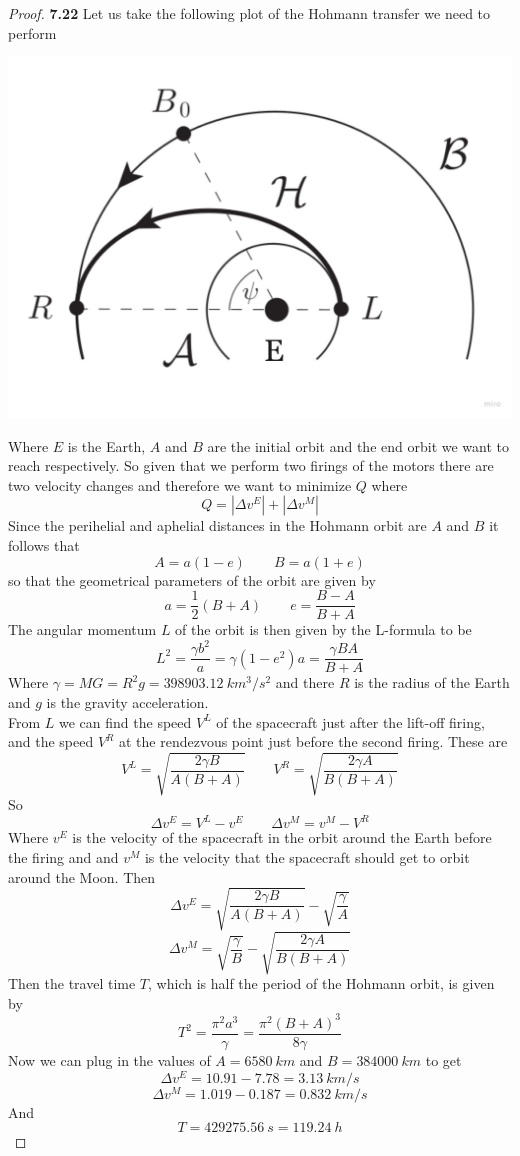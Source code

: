 \documentclass[11pt]{article}
\theoremstyle{definition}
\begin{document}
    \begin{proof}{\textbf{7.22}}
        Let us take the following plot of the Hohmann transfer we need to perform
        \begin{center}
            \includegraphics[scale=0.2]{./ch7-22.jpg}
        \end{center}
        Where $E$ is the Earth, $A$ and $B$ are the initial orbit and the
        end orbit we want to reach respectively. So given that we perform two firings of
        the motors there are two velocity changes and therefore we want to minimize $Q$
        where
        $$Q = |\Delta v^E| + |\Delta v^M|$$
        Since the perihelial and aphelial distances in the Hohmann orbit are $A$ and $B$
        it follows that
        $$A = a(1-e) \quad\quad B =a(1+e)$$
        so that the geometrical parameters of the orbit are given by
        $$a=\frac{1}{2}(B + A) \quad\quad e = \frac{B - A}{B + A}$$
        The angular momentum $L$ of the orbit is then given by the L-formula to be
        $$L^2 = \frac{\gamma b^2}{a} = \gamma(1-e^2)a = \frac{\gamma BA}{B+A}$$
        Where $\gamma = MG = R^2g = 398903.12~km^3/s^2$ and there $R$ is the radius of
        the Earth and $g$ is the gravity acceleration.\\
        From $L$ we can ﬁnd the speed $V^L$ of the spacecraft just after the lift-off
        ﬁring, and the speed $V^R$ at the rendezvous point just before the second ﬁring.
        These are
        $$V^L = \sqrt{\frac{2\gamma B}{A(B+A)}} \quad\quad
        V^R = \sqrt{\frac{2\gamma A}{B(B+A)}}$$
        So
        $$\Delta v^E = V^L - v^E \quad\quad \Delta v^M = v^M - V^R$$
        Where $v^E$ is the velocity of the spacecraft in the orbit around the Earth
        before the firing and and $v^M$ is the velocity that the spacecraft should get 
        to orbit around the Moon. Then
        $$\Delta v^E = \sqrt{\frac{2\gamma B}{A(B+A)}} - \sqrt{\frac{\gamma}{A}}$$
        $$\Delta v^M = \sqrt{\frac{\gamma}{B}} - \sqrt{\frac{2\gamma A}{B(B+A)}}$$
        Then the travel time $T$, which is half the period of the Hohmann orbit, is
        given by
        $$T^2 = \frac{\pi^2 a^3}{\gamma} = \frac{\pi^2 (B+A)^3}{8 \gamma}$$
        Now we can plug in the values of $A = 6580~km$ and $B=384000~km$ to get
        $$\Delta v^E = 10.91 - 7.78 = 3.13~km/s$$
        $$\Delta v^M = 1.019-0.187 = 0.832~km/s$$
        And 
        $$T = 429275.56~s = 119.24~h$$
    \end{proof}
\end{document}
